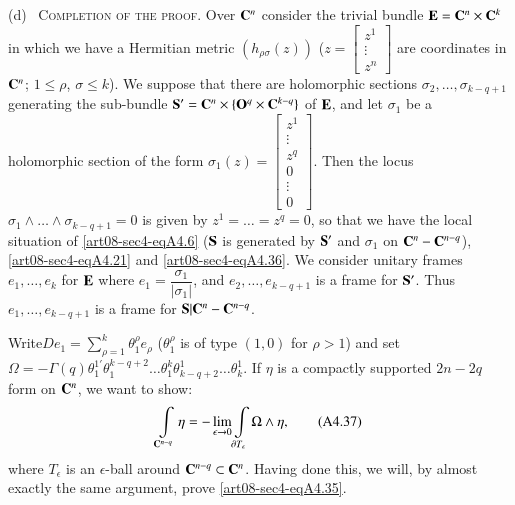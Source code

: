 (d)~ \textsc{Completion of the proof.} Over $\mathbf{C}^{n}$ consider the trivial bundle $\mathbf{E}=\mathbf{C}^{n}\times \mathbf{C}^{k}$ in which we have a Hermitian metric $(h_{\rho\sigma}(z))$ ($z=\left[\begin{smallmatrix} z^{1}\\\vdots \\[2pt] z^{n}\end{smallmatrix}\right]$ are coordinates in $\mathbf{C}^{n}$; $1\leq \rho$, $\sigma\leq k$). We suppose that there are holomorphic sections $\sigma_{2},\ldots,\sigma_{k-q+1}$ generating the sub-bundle $\mathbf{S}'=\mathbf{C}^{n}\times \{\mathbf{O}^{q}\times \mathbf{C}^{k-q}\}$ of $\mathbf{E}$, and let $\sigma_{1}$ be a holomorphic section of the form $\sigma_{1}(z)=\left[\begin{smallmatrix} z^{1}\\ \vdots\\ z^{q}\\ 0\\ \vdots\\ 0\end{smallmatrix}\right]$. Then the locus $\sigma_{1}\wedge\ldots\wedge \sigma_{k-q+1}=0$ is given by $z^{1}=\ldots=z^{q}=0$, so that we have the local situation of \eqref{art08-sec4-eqA4.6} ($\mathbf{S}$ is generated by $\mathbf{S}'$ and $\sigma_{1}$ on $\mathbf{C}^{n}-\mathbf{C}^{n-q}$), \eqref{art08-sec4-eqA4.21} and \eqref{art08-sec4-eqA4.36}. We consider unitary frames $e_{1},\ldots,e_{k}$ for $\mathbf{E}$ where $e_{1}=\dfrac{\sigma_{1}}{|\sigma_{1}|}$, and $e_{2},\ldots,e_{k-q+1}$ is a frame for $\mathbf{S}'$. Thus $e_{1},\ldots,e_{k-q+1}$ is a frame for $\mathbf{S} | \mathbf{C}^{n}-\mathbf{C}^{n-q}$.

Write\pageoriginale $De_{1}=\sum\limits^{k}_{\rho=1}\theta^{\rho}_{1}e_{\rho}$ ($\theta^{\rho}_{1}$ is of type $(1,0)$ for $\rho>1$) and set $\Omega=-\Gamma(q)\theta^{1'}_{1}\theta^{k-q+2}_{1}\ldots\theta^{k}_{1}\theta^{1}_{k-q+2}\ldots\theta^{1}_{k}$. If $\eta$ is a compactly supported $2n-2q$ form on $\mathbf{C}^{n}$, we want to show:
\begin{equation*}
\int\limits_{\mathbf{C}^{n-q}}\eta=-\lim\limits_{\epsilon\to 0}\int\limits_{\partial T_{\epsilon}}\Omega\wedge \eta,\tag{A4.37}\label{art08-sec4-eqA4.37}
\end{equation*}
where $T_{\epsilon}$ is an $\epsilon$-ball around $\mathbf{C}^{n-q}\subset \mathbf{C}^{n}$. Having done this, we will, by almost exactly the same argument, prove \eqref{art08-sec4-eqA4.35}.

